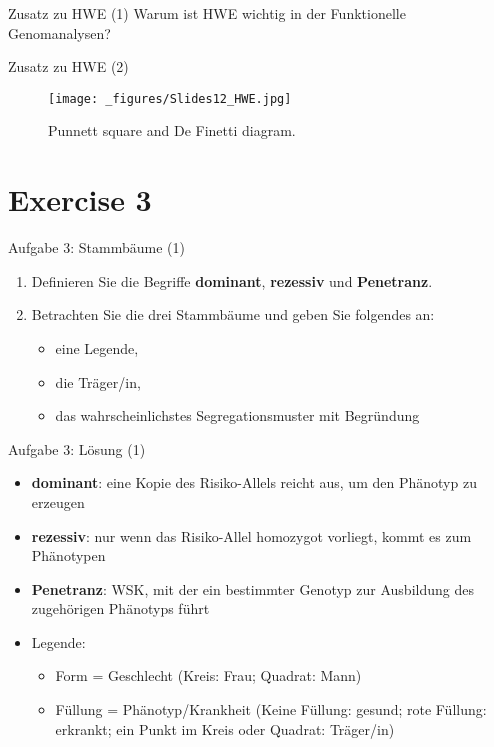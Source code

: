 \documentclass{beamer}
\begin{document}
\begin{frame}{Zusatz zu HWE (1)}
Warum ist HWE wichtig in der Funktionelle Genomanalysen?    
\end{frame}

\begin{frame}{Zusatz zu HWE (2)}
\begin{figure}[h]
\begin{center}
\texttt{[image: \_figures/Slides12\_HWE.jpg]}
\caption{Punnett square and De Finetti diagram.}
\label{fig:HWE}
\end{center}
\end{figure}
\end{frame}

\section{Exercise 3}

\begin{frame}{Aufgabe 3: Stammbäume (1)}
\begin{enumerate}
    \item Definieren Sie die Begriffe \textbf{dominant}, \textbf{rezessiv} und \textbf{Penetranz}.
    \item Betrachten Sie die drei Stammbäume und geben Sie folgendes an:
    \begin{itemize}
        \item eine Legende,
        \item die Träger/in,
        \item das wahrscheinlichstes Segregationsmuster mit Begründung
    \end{itemize}
\end{enumerate}
\end{frame}

\begin{frame}{Aufgabe 3: Lösung (1)}
\begin{itemize}
    \item \textbf{dominant}: eine Kopie des Risiko-Allels reicht aus, um den Phänotyp zu erzeugen
    \item \textbf{rezessiv}: nur wenn das Risiko-Allel homozygot vorliegt, kommt es zum Phänotypen
    \item \textbf{Penetranz}: WSK, mit der ein bestimmter Genotyp zur Ausbildung des zugehörigen Phänotyps führt
    \item Legende:
    \begin{itemize}
        \item Form = Geschlecht (Kreis: Frau; Quadrat: Mann)
        \item Füllung = Phänotyp/Krankheit (Keine Füllung: gesund; rote Füllung: erkrankt; ein Punkt im Kreis oder Quadrat: Träger/in)
    \end{itemize}
\end{itemize}
\end{frame}
\end{document}
